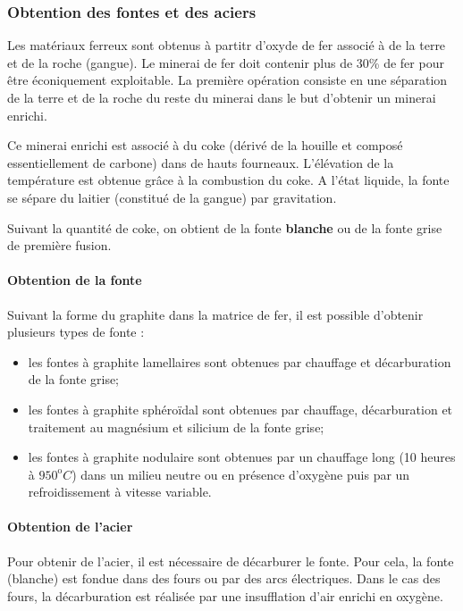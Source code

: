 \documentclass[11pt,oneside]{article}
\begin{document}
\subsubsection{Obtention des fontes et des aciers}
Les matériaux ferreux sont obtenus à partitr d'oxyde de fer associé à de la terre et de la roche (gangue). Le minerai de fer doit contenir plus de 30\% de fer pour être éconiquement exploitable.
La première opération consiste en une séparation de la terre et de la roche du reste du minerai dans le but d'obtenir un minerai enrichi. 

Ce minerai enrichi est associé à du coke (dérivé de la houille et composé essentiellement de carbone) dans de hauts fourneaux. L'élévation de la température est obtenue grâce à la combustion du coke. A l'état liquide, la fonte se sépare du laitier (constitué de la gangue) par gravitation. 

Suivant la quantité de coke, on obtient de la fonte \textbf{blanche} ou de la {fonte grise de première fusion}.


\paragraph{Obtention de la fonte}
Suivant la forme du graphite dans la matrice de fer, il est possible d'obtenir plusieurs types de fonte : 

\begin{itemize}
\item les fontes à graphite lamellaires sont obtenues par chauffage et décarburation de la fonte grise;
\item les fontes à graphite sphéroïdal sont obtenues par chauffage, décarburation et traitement au magnésium et silicium de la fonte grise;
\item les fontes à graphite nodulaire sont obtenues par un chauffage long (10 heures à $950^{\text{o}}C$) dans un milieu neutre ou en présence d'oxygène puis par un refroidissement à vitesse variable. 
\end{itemize}

\paragraph{Obtention de l'acier}

Pour obtenir de l'acier, il est nécessaire de décarburer le fonte. Pour cela, la fonte (blanche) est fondue dans des fours ou par des arcs électriques. Dans le cas des fours, la décarburation est réalisée par une insufflation d'air enrichi en oxygène. 
\end{document}
